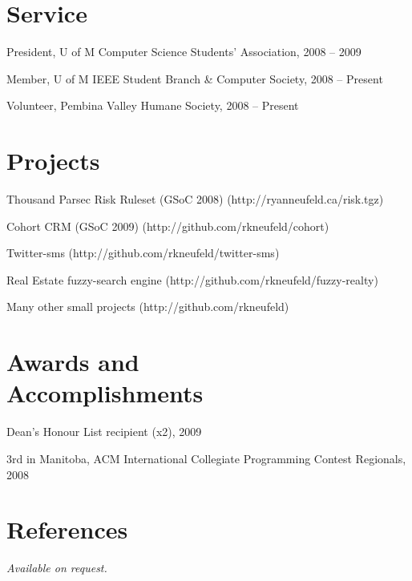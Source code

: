 \documentclass[margin,line,letterpaper]{resume}
\begin{document}
\begin{resume}
  \section{\mysidestyle Service}

  \begin{list2}
    \item President, U of M Computer Science Students' Association, 2008 -- 2009
    \item Member, U of M IEEE Student Branch \& Computer Society, 2008 -- Present
    \item Volunteer, Pembina Valley Humane Society, 2008 -- Present
  \end{list2}

  \section{\mysidestyle Projects}

  \begin{list2}
    \item Thousand Parsec Risk Ruleset (GSoC 2008) (http://ryanneufeld.ca/risk.tgz)
    \item Cohort CRM (GSoC 2009) (http://github.com/rkneufeld/cohort)
    \item Twitter-sms (http://github.com/rkneufeld/twitter-sms)
    \item Real Estate fuzzy-search engine (http://github.com/rkneufeld/fuzzy-realty)
    \item Many other small projects (http://github.com/rkneufeld)
  \end{list2}


  \section{\mysidestyle Awards and\\Accomplishments}

  \begin{list2}
    \item Dean's Honour List recipient (x2), 2009
    \item 3rd in Manitoba, ACM International Collegiate Programming Contest Regionals, 2008
  \end{list2}

  \section{\mysidestyle References}

  {\sl Available on request.}

\end{resume}
\end{document}
